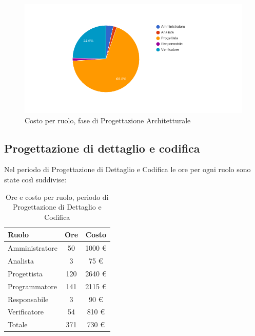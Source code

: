 \begin{figure}[H]
  \begin{center}
    \includegraphics[width=15cm]{res/img/prospettoEconomico/costoPerRuoloProgettazioneArchitetturale.png}
  \caption{Costo per ruolo, fase di Progettazione Architetturale}
  \end{center} 
\end{figure}  


\subsection{Progettazione di dettaglio e codifica}
Nel periodo di Progettazione di Dettaglio e Codifica le ore per ogni ruolo sono state così suddivise:

\begin{table}[H]
	\centering
	\begin{tabular}{ l c c }
		\textbf{Ruolo} & \textbf{Ore} & \textbf{Costo} \\
		\hline
		Amministratore & 50 & 1000 \euro{} \\
		Analista & 3 & 75 \euro{} \\
		Progettista & 120 & 2640 \euro{} \\
		Programmatore & 141 & 2115 \euro{} \\
		Responsabile & 3 & 90 \euro{} \\
		Verificatore & 54 & 810 \euro{} \\
		\hline
		Totale & 371 & 730 \euro{} \\
		\hline
	\end{tabular}
	\caption{Ore e costo per ruolo, periodo di Progettazione di Dettaglio e Codifica}
\end{table}

